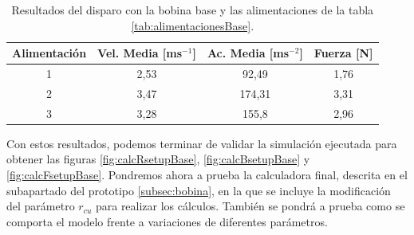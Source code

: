 \begin{table}[H]
    \centering
    \setlength{\tabcolsep}{5pt}
    \renewcommand{\arraystretch}{1.2}
    \begin{tabular}{|c|c|c|c|}
        \hline
        \textbf{Alimentación} & \textbf{Vel. Media [ms\(^{-1}\)]} & \textbf{Ac. Media [ms\(^{-2}\)]} & \textbf{Fuerza [N]} \\
        \hline
        1 & 2,53 & 92,49 & 1,76 \\
        2 & 3,47 & 174,31 & 3,31 \\
        3 & 3,28 & 155,8 & 2,96 \\
        \hline
    \end{tabular}
    \caption{Resultados del disparo con la bobina base y las alimentaciones de la tabla \ref{tab:alimentacionesBase}.}
    \label{tab:resultadosBase}
\end{table}

\restoregeometry

Con estos resultados, podemos terminar de validar la simulación ejecutada para obtener las figuras \ref{fig:calcRsetupBase}, \ref{fig:calcBsetupBase} y \ref{fig:calcFsetupBase}. Pondremos ahora a prueba la calculadora final, descrita en el subapartado del prototipo \ref{subsec:bobina}, en la que se incluye la modificación del parámetro \(r_{cu}\) para realizar los cálculos. También se pondrá a prueba como se comporta el modelo frente a variaciones de diferentes parámetros.